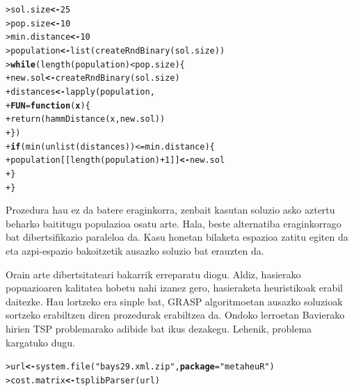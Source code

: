\documentclass[eu]{ifirak}\usepackage[]{graphicx}\usepackage[]{color}
\makeatletter
\newcommand{\hlnum}[1]{\textcolor[rgb]{0.659,0.4,0.051}{#1}}%
\newcommand{\hlstr}[1]{\textcolor[rgb]{0.659,0.4,0.051}{#1}}%
\newcommand{\hlopt}[1]{\textcolor[rgb]{0,0,0}{#1}}%
\newcommand{\hlstd}[1]{\textcolor[rgb]{0,0,0}{#1}}%
\newcommand{\hlkwa}[1]{\textcolor[rgb]{0.133,0.224,0.659}{\textbf{#1}}}%
\newcommand{\hlkwb}[1]{\textcolor[rgb]{0.549,0.114,0.412}{\textbf{#1}}}%
\newcommand{\hlkwc}[1]{\textcolor[rgb]{0.659,0.573,0.133}{\textbf{#1}}}%
\newcommand{\hlkwd}[1]{\textcolor[rgb]{0.659,0.133,0.482}{#1}}%
\newenvironment{kframe}{%
 \def\at@end@of@kframe{}%
 \ifinner\ifhmode%
  \def\at@end@of@kframe{\end{minipage}}%
  \begin{minipage}{\columnwidth}%
 \fi\fi%
 \def\FrameCommand##1{\hskip\@totalleftmargin \hskip-\fboxsep
 \colorbox{shadecolor}{##1}\hskip-\fboxsep
     \hskip-\linewidth \hskip-\@totalleftmargin \hskip\columnwidth}%
 \MakeFramed {\advance\hsize-\width
   \@totalleftmargin\z@ \linewidth\hsize
   \@setminipage}}%
 {\par\unskip\endMakeFramed%
 \at@end@of@kframe}
\newenvironment{knitrout}{}{} %
\makeatother
\begin{document}
\begin{knitrout}
\color{fgcolor}\begin{kframe}
\begin{alltt}
\hlstd{> }\hlstd{sol.size} \hlkwb{<-} \hlnum{25}
\hlstd{> }\hlstd{pop.size} \hlkwb{<-} \hlnum{10}
\hlstd{> }\hlstd{min.distance} \hlkwb{<-} \hlnum{10}
\hlstd{> }\hlstd{population} \hlkwb{<-} \hlkwd{list}\hlstd{(}\hlkwd{createRndBinary}\hlstd{(sol.size))}
\hlstd{> }\hlkwa{while} \hlstd{(}\hlkwd{length}\hlstd{(population)} \hlopt{<} \hlstd{pop.size) \{}
\hlstd{+ }  \hlstd{new.sol} \hlkwb{<-} \hlkwd{createRndBinary}\hlstd{(sol.size)}
\hlstd{+ }  \hlstd{distances} \hlkwb{<-} \hlkwd{lapply}\hlstd{(population,}
\hlstd{+ }                      \hlkwc{FUN}\hlstd{=}\hlkwa{function}\hlstd{(}\hlkwc{x}\hlstd{) \{}
\hlstd{+ }                        \hlkwd{return}\hlstd{(}\hlkwd{hammDistance} \hlstd{(x, new.sol))}
\hlstd{+ }                      \hlstd{\})}
\hlstd{+ }  \hlkwa{if} \hlstd{(}\hlkwd{min}\hlstd{(}\hlkwd{unlist}\hlstd{(distances))} \hlopt{<=} \hlstd{min.distance) \{}
\hlstd{+ }    \hlstd{population[[}\hlkwd{length}\hlstd{(population)} \hlopt{+} \hlnum{1}\hlstd{]]} \hlkwb{<-} \hlstd{new.sol}
\hlstd{+ }  \hlstd{\}}
\hlstd{+ }\hlstd{\}}
\end{alltt}
\end{kframe}
\end{knitrout}


Prozedura hau ez da batere eraginkorra, zenbait kasutan soluzio asko aztertu beharko baititugu populazioa osatu arte. Hala, beste alternatiba eraginkorrago bat dibertsifikazio paraleloa da. Kasu honetan bilaketa espazioa zatitu egiten da eta azpi-espazio bakoitzetik ausazko soluzio bat erauzten da.

Orain arte dibertsitateari bakarrik erreparatu diogu. Aldiz, hasierako popuazioaren kalitatea hobetu nahi izanez gero, hasieraketa heuristikoak erabil daitezke. Hau lortzeko era sinple bat, GRASP algoritmoetan ausazko soluzioak sortzeko erabiltzen diren prozedurak erabiltzea da. Ondoko lerroetan Bavierako hirien TSP problemarako adibide bat ikus dezakegu. Lehenik, problema kargatuko dugu.

\begin{knitrout}
\color{fgcolor}\begin{kframe}
\begin{alltt}
\hlstd{> }\hlstd{url} \hlkwb{<-} \hlkwd{system.file}\hlstd{(}\hlstr{"bays29.xml.zip"}\hlstd{,} \hlkwc{package}\hlstd{=}\hlstr{"metaheuR"}\hlstd{)}
\hlstd{> }\hlstd{cost.matrix} \hlkwb{<-} \hlkwd{tsplibParser}\hlstd{(url)}
\end{alltt}
\end{kframe}
\end{knitrout}
\end{document}
